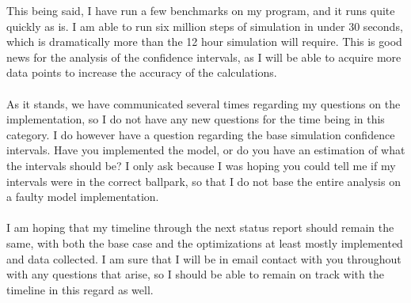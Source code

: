 \documentclass[letterpaper,10pt]{article}
\begin{document}
This being said, I have run a few benchmarks on my program, and it runs quite quickly as is. I am able to run six million steps of simulation in under 30 seconds, which is dramatically more than the 12 hour simulation will require. This is good news for the analysis of the confidence intervals, as I will be able to acquire more data points to increase the accuracy of the calculations.\\\\
As it stands, we have communicated several times regarding my questions on the implementation, so I do not have any new questions for the time being in this category. I do however have a question regarding the base simulation confidence intervals. Have you implemented the model, or do you have an estimation of what the intervals should be? I only ask because I was hoping you could tell me if my intervals were in the correct ballpark, so that I do not base the entire analysis on a faulty model implementation.\\\\
I am hoping that my timeline through the next status report should remain the same, with both the base case and the optimizations at least mostly implemented and data collected. I am sure that I will be in email contact with you throughout with any questions that arise, so I should be able to remain on track with the timeline in this regard as well.
\end{document}
